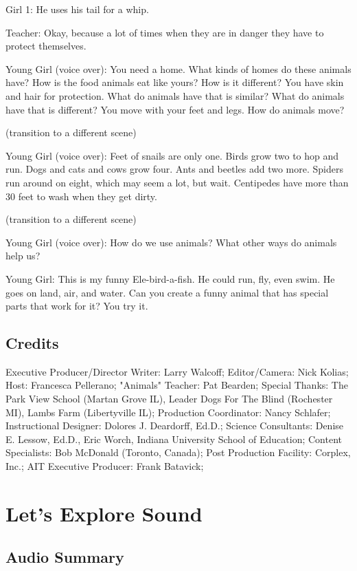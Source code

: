 Girl 1: He uses his tail for a whip.

Teacher: Okay, because a lot of times when they are in danger they have to protect themselves.

Young Girl (voice over): You need a home. What kinds of homes do these animals have? How is the food animals eat like yours? How is it different? You have skin and hair for protection. What do animals have that is similar? What do animals have that is different? You move with your feet and legs. How do animals move?

(transition to a different scene)

Young Girl (voice over): Feet of snails are only one. Birds grow two to hop and run. Dogs and cats and cows grow four. Ants and beetles add two more. Spiders run around on eight, which may seem a lot, but wait. Centipedes have more than 30 feet to wash when they get dirty.

(transition to a different scene)

Young Girl (voice over): How do we use animals? What other ways do animals help us?

Young Girl: This is my funny Ele-bird-a-fish. He could run, fly, even swim. He goes on land, air, and water. Can you create a funny animal that has special parts that work for it? You try it.

\subsection{Credits}

Executive Producer/Director Writer: Larry Walcoff;
Editor/Camera: Nick Kolias;
Host: Francesca Pellerano;
"Animals" Teacher: Pat Bearden;
Special Thanks: The Park View School (Martan Grove IL), Leader Dogs For The Blind (Rochester MI), Lambs Farm (Libertyville IL);
Production Coordinator: Nancy Schlafer;
Instructional Designer: Dolores J. Deardorff, Ed.D.;
Science Consultants: Denise E. Lessow, Ed.D., Eric Worch, Indiana University School of Education;
Content Specialists: Bob McDonald (Toronto, Canada);
Post Production Facility: Corplex, Inc.;
AIT Executive Producer: Frank Batavick;

\section{Let's Explore Sound}

\subsection{Audio Summary}

